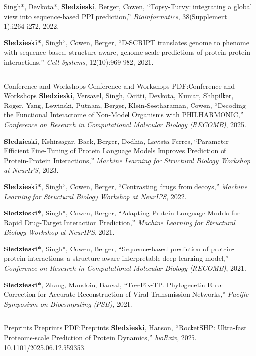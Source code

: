 \documentclass[letterpaper,MMMyyyy,nonstopmode]{simpleresumecv}
\begin{document}
\begin{Body}
\Gap
\NumberedItem{[2]}
{{Singh*, Devkota*, \textbf{Sledzieski}, Berger, Cowen}, 
``Topsy-Turvy: integrating a global view into sequence-based PPI prediction,'' 
\textit{Bioinformatics}, 38(Supplement 1):i264-i272, 2022.
}

\Gap
\NumberedItem{[1]}
{{\textbf{Sledzieski*}, Singh*, Cowen, Berger}, 
``D-SCRIPT translates genome to phenome with sequence-based, structure-aware, genome-scale predictions of protein-protein interactions,'' 
\textit{Cell Systems}, 12(10):969-982, 2021.
}


\BigGap
\hrule
\Section
{Conference and Workshops}
{Conference and Workshops}
{PDF:Conference and Workshops}
\Gap
\NumberedItem{[6]}
{{\textbf{Sledzieski}, Versavel, Singh, Ocitti, Devkota, Kumar, Shhpilker, Roger, Yang, Lewinski, Putnam, Berger, Klein-Seetharaman, Cowen}, 
``Decoding the Functional Interactome of Non-Model Organisms with PHILHARMONIC,'' 
\textit{Conference on Research in Computational Molecular Biology (RECOMB)}, 2025.
}

\Gap
\NumberedItem{[5]}
{{\textbf{Sledzieski}, Kshirsagar, Baek, Berger, Dodhia, Lavista Ferres}, 
``Parameter-Efficient Fine-Tuning of Protein Language Models Improves Prediction of Protein-Protein Interactions,'' 
\textit{Machine Learning for Structural Biology Workshop at NeurIPS}, 2023.
}

\Gap
\NumberedItem{[4]}
{{\textbf{Sledzieski*}, Singh*, Cowen, Berger}, 
``Contrasting drugs from decoys,'' 
\textit{Machine Learning for Structural Biology Workshop at NeurIPS}, 2022.
}

\Gap
\NumberedItem{[3]}
{{\textbf{Sledzieski*}, Singh*, Cowen, Berger}, 
``Adapting Protein Language Models for Rapid Drug-Target Interaction Prediction,'' 
\textit{Machine Learning for Structural Biology Workshop at NeurIPS}, 2021.
}

\Gap
\NumberedItem{[2]}
{{\textbf{Sledzieski*}, Singh*, Cowen, Berger}, 
``Sequence-based prediction of protein-protein interactions: a structure-aware interpretable deep learning model,'' 
\textit{Conference on Research in Computational Molecular Biology (RECOMB)}, 2021.
}

\Gap
\NumberedItem{[1]}
{{\textbf{Sledzieski*}, Zhang, Mandoiu, Bansal}, 
``TreeFix-TP: Phylogenetic Error Correction for Accurate Reconstruction of Viral Transmission Networks,'' 
\textit{Pacific Symposium on Biocomputing (PSB)}, 2021.
}


\BigGap
\hrule
\Section
{Preprints}
{Preprints}
{PDF:Preprints}
\Gap
\NumberedItem{[4]}
{{\textbf{Sledzieski}, Hanson}, 
``RocketSHP: Ultra-fast Proteome-scale Prediction of Protein Dynamics,'' 
\textit{bioRxiv}, 2025. 10.1101/2025.06.12.659353.
}


\end{Body}
\end{document}
